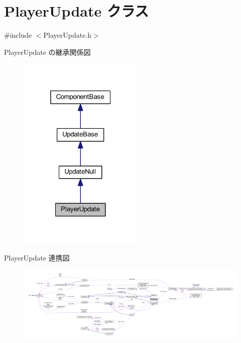 \hypertarget{class_player_update}{}\section{Player\+Update クラス}
\label{class_player_update}


{\ttfamily \#include $<$Player\+Update.\+h$>$}



Player\+Update の継承関係図\nopagebreak
\begin{figure}[H]
\begin{center}
\leavevmode
\includegraphics[width=169pt]{class_player_update__inherit__graph}
\end{center}
\end{figure}


Player\+Update 連携図
\nopagebreak
\begin{figure}[H]
\begin{center}
\leavevmode
\includegraphics[width=350pt]{class_player_update__coll__graph}
\end{center}
\end{figure}

